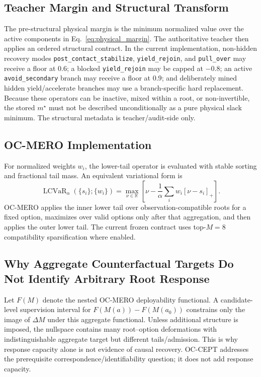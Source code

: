 \documentclass[conference]{IEEEtran}
\DeclareMathOperator{\LCVaR}{LCVaR}
\begin{document}
\subsection{Teacher Margin and Structural Transform}
\label{app:teacher_margins}
The pre-structural physical margin is the minimum normalized value over the active components in Eq.~\eqref{eq:physical_margin}. The authoritative teacher then applies an ordered structural contract. In the current implementation, non-hidden recovery modes \texttt{post\_contact\_stabilize}, \texttt{yield\_rejoin}, and \texttt{pull\_over} may receive a floor at $0.6$; a blocked \texttt{yield\_rejoin} may be capped at $-0.8$; an active \texttt{avoid\_secondary} branch may receive a floor at $0.9$; and deliberately mined hidden yield/accelerate branches may use a branch-specific hard replacement. Because these operators can be inactive, mixed within a root, or non-invertible, the stored $m^\star$ must not be described unconditionally as a pure physical slack minimum. The structural metadata is teacher/audit-side only.

\subsection{OC-MERO Implementation}
\label{app:ocmero_impl}
For normalized weights $w_i$, the lower-tail operator is evaluated with stable sorting and fractional tail mass. An equivalent variational form is
\begin{equation}
 \LCVaR_{\alpha}(\{s_i\};\{w_i\})=\max_{\nu\in\mathbb{R}}\left[\nu-\frac{1}{\alpha}\sum_iw_i[\nu-s_i]_+\right].
\end{equation}
OC-MERO applies the inner lower tail over observation-compatible roots for a fixed option, maximizes over valid options only after that aggregation, and then applies the outer lower tail. The current frozen contract uses top-$M=8$ compatibility sparsification where enabled.

\subsection{Why Aggregate Counterfactual Targets Do Not Identify Arbitrary Root Response}
Let $F(M)$ denote the nested OC-MERO deployability functional. A candidate-level supervision interval for $F(M(a))-F(M(a_0))$ constrains only the image of $\Delta M$ under this aggregate functional. Unless additional structure is imposed, the nullspace contains many root--option deformations with indistinguishable aggregate target but different tails/admission. This is why response capacity alone is not evidence of causal recovery. OC-CEPT addresses the prerequisite correspondence/identifiability question; it does not add response capacity.
\end{document}
